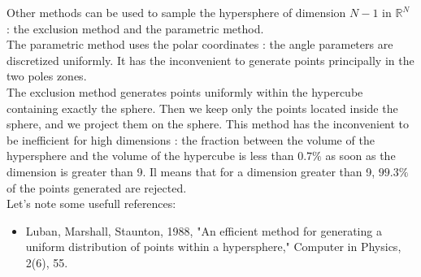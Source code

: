 {
  Other methods can be used to sample the hypersphere of dimension $N-1$ in $\mathbb{R}^N$ : the exclusion method and the parametric method.\\
  The parametric method uses the polar coordinates : the angle parameters are discretized uniformly. It has the inconvenient to generate points principally in the two poles zones.\\
  The exclusion method generates points uniformly within the hypercube containing exactly the sphere. Then we keep only the points located inside the sphere, and we project them on the sphere. This method has the inconvenient to be inefficient for high dimensions : the fraction between the  volume of the hypersphere and the volume of the hypercube  is less than $0.7 \%$ as soon as the dimension is greater than 9. Il means that for a dimension greater than 9, $99.3\%$ of the points generated are rejected. \\

  Let's note some usefull references:
  \begin{itemize}
  \item Luban, Marshall, Staunton, 1988, "An efficient method for generating a uniform distribution of points within a hypersphere," Computer in Physics, 2(6), 55.
  \end{itemize}
}
